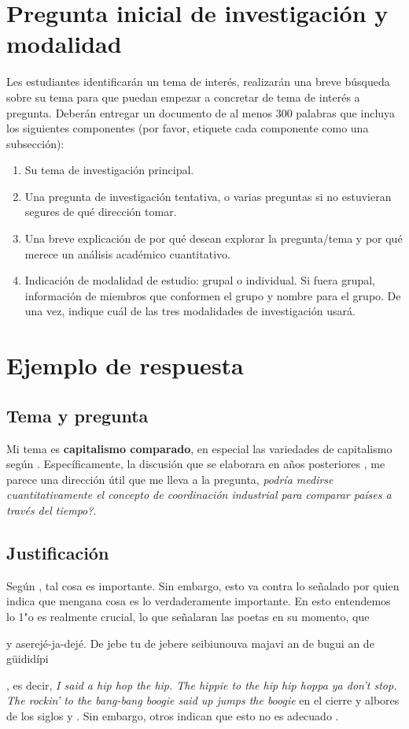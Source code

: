 \documentclass[11pt]{article}
\begin{document}
\newpage

\section{Pregunta inicial de investigación y modalidad}
Les estudiantes identificarán un tema de interés, realizarán una breve búsqueda sobre su tema para que puedan empezar a concretar de tema de interés a pregunta. Deberán entregar un documento de al menos 300 palabras que incluya los siguientes componentes (por favor, etiquete cada componente como una subsección):
\begin{enumerate}
    \item Su tema de investigación principal.
    \item Una pregunta de investigación tentativa, o varias preguntas si no estuvieran segures de qué dirección tomar.
    \item Una breve explicación de por qué desean explorar la pregunta/tema y por qué merece un análisis académico cuantitativo.
    \item Indicación de modalidad de estudio: grupal o individual. Si fuera grupal, información de miembros que conformen el grupo y nombre para el grupo. De una vez, indique cuál de las tres modalidades de investigación usará.
\end{enumerate}

\section{Ejemplo de respuesta}

\subsection{Tema y pregunta}
Mi tema es \textbf{capitalismo comparado}, en especial las variedades de capitalismo seg\'un \citet{hall2001introduction}. Espec\'ificamente, la discusi\'on que se elaborara en a\~nos posteriores \citep{hall2009institutional}, me parece una direcci\'on \'util que me lleva a la pregunta, \textit{podría medirse cuantitativamente el concepto de coordinaci\'on industrial para comparar países a través del tiempo?}.

\subsection{Justificación}
Según \citet{giovannetti2015}, tal cosa es importante. Sin embargo, esto va contra lo señalado por \citet{lopezroman2012} quien indica que mengana cosa es lo verdaderamente importante. En esto entendemos lo 1"o es realmente crucial, lo que señalaran las poetas en su momento, que \begin{quoting}y aserejé-ja-dejé. De jebe tu de jebere seibiunouva majavi an de bugui an de güididípi\end{quoting}, es decir, \textit{I said a hip hop the hip. The hippie to the hip hip hoppa ya don’t stop. The rockin’ to the bang-bang boogie said up jumps the boogie} en el cierre y albores de los siglos  y  \citep{Hails2022}. Sin embargo, otros indican que esto no es adecuado \citep{nunn2011slave}.
\end{document}
